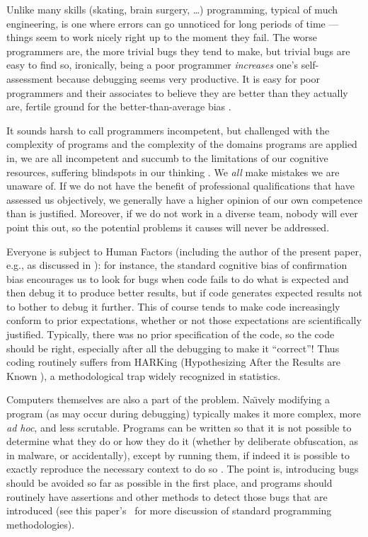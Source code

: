 \documentclass[10pt,a4paper]{article}
\begin{document}
Unlike many skills (skating, brain surgery, \ldots) programming, typical of much engineering, is one where errors can go unnoticed for long periods of time --- things seem to work nicely right up to the moment they fail. The worse programmers are, the more trivial bugs they tend to make, but trivial bugs are easy to find so, ironically, being a poor programmer \emph{increases\/} one's self-assessment because debugging seems very productive. It is easy for poor programmers and their associates to believe they are better than they actually are, fertile ground for the better-than-average bias \cite{dunning-kruger}.

It sounds harsh to call programmers incompetent, but challenged with the complexity of programs and the complexity of the domains programs are applied in, we are all incompetent and succumb to the limitations of our cognitive resources, suffering blindspots in our thinking \cite{fixit}. We \emph{all\/} make mistakes we are unaware of. If we do not have the benefit of professional qualifications that have assessed us objectively, we generally have a higher opinion of our own competence than is justified. Moreover, if we do not work in a diverse team, nobody will ever point this out, so the potential problems it causes will never be addressed.

{Everyone is subject to Human Factors (including the author of the present paper, e.g., as discussed in \cite{enigma}): for instance, the standard cognitive bias of confirmation bias encourages us to look for bugs when code fails to do what is expected and then debug it to produce better results, but if code generates expected results not to bother to debug it further. This of course tends to make code increasingly conform to prior expectations, whether or not those expectations are scientifically justified. Typically, there was no prior specification of the code, so the code should be right, especially after all the debugging to make it ``correct''! Thus coding routinely suffers from HARKing (Hypothesizing After the Results are Known \cite{harking}), a methodological trap widely recognized in statistics.}

Computers themselves are also a part of the problem. Na\"\i vely modifying a program (as may occur during debugging) typically makes it more complex, more \emph{ad hoc}, and less scrutable. Programs can be written so that it is not possible to determine what they do or how they do it (whether by deliberate obfuscation, as in malware, or accidentally), except by running them, if indeed it is possible to exactly reproduce the necessary context to do so \cite{framework}. The point is, introducing bugs should be avoided so far as possible in the first place, and programs should routinely have assertions and other methods to detect those bugs that are introduced (see this paper's \supplement\ for more discussion of standard programming methodologies).
\end{document}
